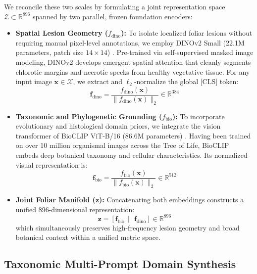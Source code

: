 \documentclass[conference]{IEEEtran}
\begin{document}
We reconcile these two scales by formulating a joint representation space $\mathcal{Z} \subset \mathbb{R}^{896}$ spanned by two parallel, frozen foundation encoders:
\begin{itemize}
    \item \textbf{Spatial Lesion Geometry ($f_{\text{dino}}$):} To isolate localized foliar lesions without requiring manual pixel-level annotations, we employ DINOv2 Small (22.1M parameters, patch size $14 \times 14$) \cite{oquab2023dinov2}. Pre-trained via self-supervised masked image modeling, DINOv2 develops emergent spatial attention that cleanly segments chlorotic margins and necrotic specks from healthy vegetative tissue. For any input image $\mathbf{x} \in \mathcal{X}$, we extract and $\ell_2$-normalize the global [CLS] token:
    \begin{equation}
    \mathbf{f}_{\text{dino}} = \frac{f_{\text{dino}}(\mathbf{x})}{\|f_{\text{dino}}(\mathbf{x})\|_2} \in \mathbb{R}^{384}
    \end{equation}
    \item \textbf{Taxonomic and Phylogenetic Grounding ($f_{\text{bio}}$):} To incorporate evolutionary and histological domain priors, we integrate the vision transformer of BioCLIP ViT-B/16 (86.6M parameters) \cite{stevens2024bioclip}. Having been trained on over 10 million organismal images across the Tree of Life, BioCLIP embeds deep botanical taxonomy and cellular characteristics. Its normalized visual representation is:
    \begin{equation}
    \mathbf{f}_{\text{bio}} = \frac{f_{\text{bio}}(\mathbf{x})}{\|f_{\text{bio}}(\mathbf{x})\|_2} \in \mathbb{R}^{512}
    \end{equation}
    \item \textbf{Joint Foliar Manifold ($\mathbf{z}$):} Concatenating both embeddings constructs a unified 896-dimensional representation:
    \begin{equation}
    \mathbf{z} = \left[\mathbf{f}_{\text{bio}} \,\|\, \mathbf{f}_{\text{dino}}\right] \in \mathbb{R}^{896}
    \end{equation}
    which simultaneously preserves high-frequency lesion geometry and broad botanical context within a unified metric space.
\end{itemize}

\subsection{Taxonomic Multi-Prompt Domain Synthesis}
\label{sec:taxonomic_prompts}
\end{document}
